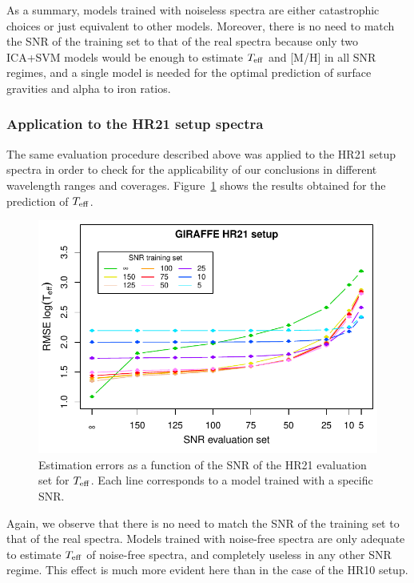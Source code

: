\documentclass[a4paper,fleqn,usenatbib]{mnras}
\begin{document}
{As a summary, models trained with noiseless spectra are either 
catastrophic choices or just equivalent to other models. Moreover, 
there is no need to match the SNR of the training set to that of the 
real spectra because only two ICA+SVM models would be enough to 
estimate $T_{\rm eff}$ and [M/H] in all SNR regimes, and a single 
model is needed for the optimal prediction of surface gravities and 
alpha to iron ratios.

\subsubsection{Application to the HR21 setup spectra}

The same evaluation procedure described above was applied to the 
HR21 setup spectra in order to check for the applicability of our 
conclusions in different wavelength ranges and coverages. Figure~\ref{fig:snrtrainhr21} 
shows the results obtained for the prediction of $T_{\rm eff}$.

\begin{figure}
	\centering\includegraphics[width=\columnwidth]{snr_errors_log_global_HR21.pdf}
	\caption{Estimation errors as a function of the SNR of the HR21 evaluation 
		set for $T_{\rm eff}$. Each line corresponds 
		to a model trained with a specific SNR.}
	\label{fig:snrtrainhr21}
\end{figure}

Again, we observe that there is no need to match 
the SNR of the training set to that of the real spectra. Models 
trained with noise-free spectra are only adequate to 
estimate $T_{\rm eff}$ of noise-free spectra, and completely 
useless in any other SNR regime. This effect is much more evident 
here than in the case of the HR10 setup. 

}
\end{document}
